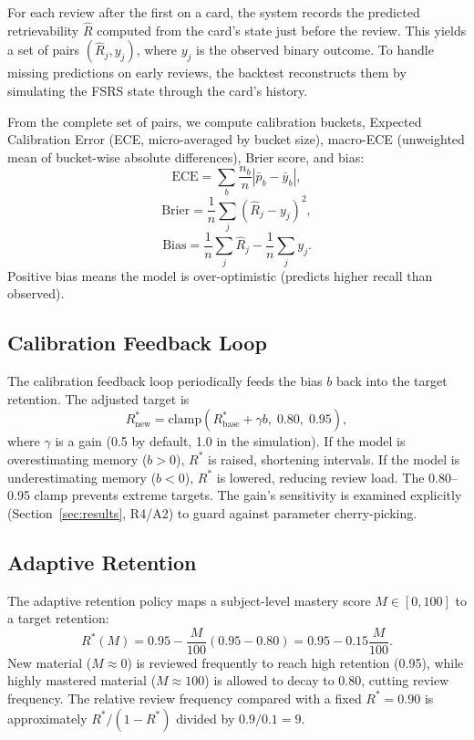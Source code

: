 \documentclass[conference]{IEEEtran}
\begin{document}
For each review after the first on a card, the system records the predicted retrievability $\hat{R}$ computed from the card's state just before the review. This yields a set of pairs $(\hat{R}_j, y_j)$, where $y_j$ is the observed binary outcome. To handle missing predictions on early reviews, the backtest reconstructs them by simulating the FSRS state through the card's history.

From the complete set of pairs, we compute calibration buckets, Expected Calibration Error (ECE, micro-averaged by bucket size), macro-ECE (unweighted mean of bucket-wise absolute differences), Brier score, and bias:
\begin{equation}
\text{ECE} = \sum_b \frac{n_b}{n}\left|\bar{p}_b - \bar{y}_b\right|,
\end{equation}
\begin{equation}
\text{Brier} = \frac{1}{n}\sum_j (\hat{R}_j - y_j)^2,
\end{equation}
\begin{equation}
\text{Bias} = \frac{1}{n}\sum_j \hat{R}_j - \frac{1}{n}\sum_j y_j.
\end{equation}
Positive bias means the model is over-optimistic (predicts higher recall than observed).

\subsection{Calibration Feedback Loop}

The calibration feedback loop periodically feeds the bias $b$ back into the target retention. The adjusted target is
\begin{equation}
R^*_{\text{new}} = \text{clamp}\left(R^*_{\text{base}} + \gamma b,\; 0.80,\; 0.95\right),
\end{equation}
where $\gamma$ is a gain (0.5 by default, 1.0 in the simulation). If the model is overestimating memory ($b > 0$), $R^*$ is raised, shortening intervals. If the model is underestimating memory ($b < 0$), $R^*$ is lowered, reducing review load. The 0.80--0.95 clamp prevents extreme targets. The gain's sensitivity is examined explicitly (Section~\ref{sec:results}, R4/A2) to guard against parameter cherry-picking.

\subsection{Adaptive Retention}

The adaptive retention policy maps a subject-level mastery score $M \in [0, 100]$ to a target retention:
\begin{equation}
R^*(M) = 0.95 - \frac{M}{100}(0.95 - 0.80) = 0.95 - 0.15 \frac{M}{100}.
\end{equation}
New material ($M \approx 0$) is reviewed frequently to reach high retention (0.95), while highly mastered material ($M \approx 100$) is allowed to decay to 0.80, cutting review frequency. The relative review frequency compared with a fixed $R^* = 0.90$ is approximately $R^*/(1 - R^*)$ divided by $0.9/0.1 = 9$.
\end{document}
